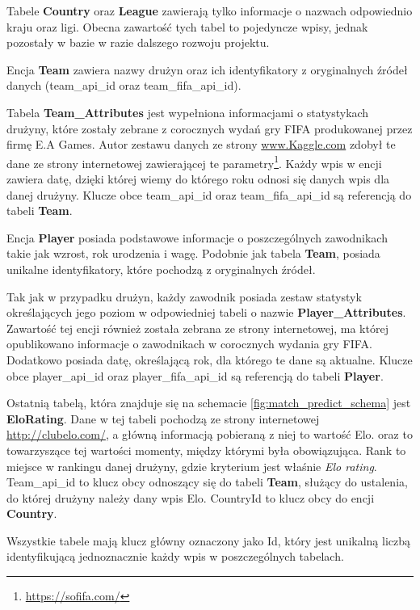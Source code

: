 Tabele \textbf{Country} oraz \textbf{League} zawierają tylko informacje o nazwach odpowiednio kraju oraz ligi. Obecna zawartość tych tabel to pojedyncze wpisy, jednak pozostały w bazie w razie dalszego rozwoju projektu.

Encja \textbf{Team} zawiera nazwy drużyn oraz ich identyfikatory z oryginalnych źródeł danych (team\_api\_id oraz team\_fifa\_api\_id).

Tabela \textbf{Team\_Attributes} jest wypełniona informacjami o statystykach drużyny, które zostały zebrane z corocznych wydań gry FIFA produkowanej przez firmę E.A Games. Autor zestawu danych ze strony \url{www.Kaggle.com} zdobył te dane ze strony internetowej zawierającej te parametry\footnote{\url{https://sofifa.com/}}. Każdy wpis w encji zawiera datę, dzięki której wiemy do którego roku odnosi się danych wpis dla danej drużyny. Klucze obce team\_api\_id oraz team\_fifa\_api\_id są referencją do tabeli \textbf{Team}.

Encja \textbf{Player} posiada podstawowe informacje o poszczególnych zawodnikach takie jak wzrost, rok urodzenia i wagę. Podobnie jak tabela \textbf{Team}, posiada unikalne identyfikatory, które pochodzą z oryginalnych źródeł.

Tak jak w przypadku drużyn, każdy zawodnik posiada zestaw statystyk określających jego poziom w odpowiedniej tabeli o nazwie \textbf{Player\_Attributes}. Zawartość tej encji również została zebrana ze strony internetowej, ma której opublikowano informacje o zawodnikach w corocznych wydania gry FIFA. Dodatkowo posiada datę, określającą rok, dla którego te dane są aktualne. Klucze obce player\_api\_id oraz player\_fifa\_api\_id są referencją do tabeli \textbf{Player}. 

Ostatnią tabelą, która znajduje się na schemacie \ref{fig:match_predict_schema} jest \textbf{EloRating}. Dane w tej tabeli pochodzą ze strony internetowej \url{http://clubelo.com/}, a główną informacją pobieraną z niej to wartość Elo.  oraz  to towarzyszące tej wartości momenty, między którymi była obowiązująca. Rank to miejsce w rankingu danej drużyny, gdzie kryterium jest właśnie \textit{Elo rating}. Team\_api\_id to klucz obcy odnoszący się do tabeli \textbf{Team}, służący do ustalenia, do której drużyny należy dany wpis Elo. CountryId to klucz obcy do encji \textbf{Country}.

Wszystkie tabele mają klucz główny oznaczony jako Id, który jest unikalną liczbą identyfikującą jednoznacznie każdy wpis w poszczególnych tabelach.
\newpage
